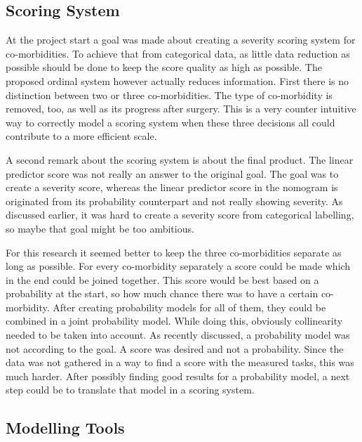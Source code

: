 \documentclass[10pt,a4paper]{article}
\begin{document}
	\subsection{Scoring System}
	
	At the project start a goal was made about creating a severity scoring system for co-morbidities. To achieve that from categorical data, as little data reduction as possible should be done to keep the score quality as high as possible. The proposed ordinal system however actually reduces information. First there is no distinction between two or three co-morbidities. The type of co-morbidity is removed, too, as well as its progress after surgery. This is a very counter intuitive way to correctly model a scoring system when these three decisions all could contribute to a more efficient scale.
	
	A second remark about the scoring system is about the final product. The linear predictor score was not really an answer to the original goal. The goal was to create a severity score, whereas the linear predictor score in the nomogram is originated from its probability counterpart and not really showing severity. As discussed earlier, it was hard to create a severity score from categorical labelling, so maybe that goal might be too ambitious. %
	
	For this research it seemed better to keep the three co-morbidities separate as long as possible. For every co-morbidity separately a score could be made which in the end could be joined together. This score would be best based on a probability at the start, so how much chance there was to have a certain co-morbidity. After creating probability models for all of them, they could be combined in a joint probability model. While doing this, obviously collinearity needed to be taken into account. As recently discussed, a probability model was not according to the goal. A score was desired and not a probability. Since the data was not gathered in a way to find a score with the measured tasks, this was much harder. After possibly finding good results for a probability model, a next step could be to translate that model in a scoring system.
	
	\subsection{Modelling Tools}
\end{document}
